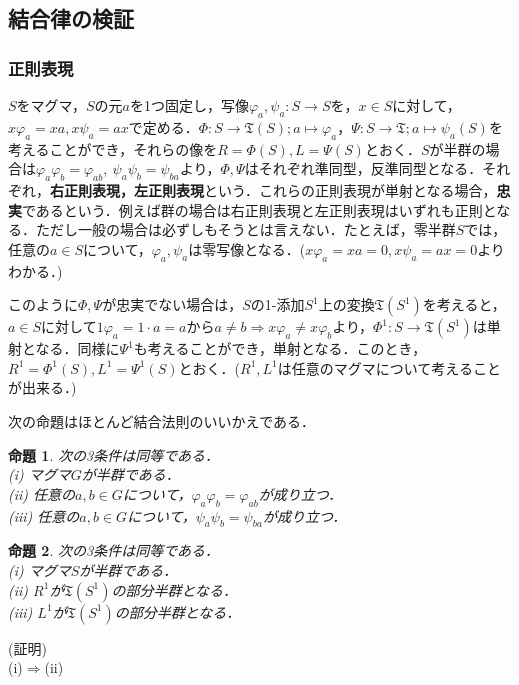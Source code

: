 \documentclass{jsarticle}
\begin{document}
\subsection{結合律の検証}
\subsubsection{正則表現}
$S$をマグマ，$S$の元$a$を1つ固定し，写像$\varphi_a, \psi_a:S\rightarrow S$を，$x\in S$に対して，$x\varphi_a=xa,x\psi_a=ax$で定める．$\Phi:S\rightarrow{\mathfrak T}(S);a\mapsto \varphi_a$，$\Psi:S\rightarrow{\mathfrak T};a\mapsto \psi_a(S)$を考えることができ，それらの像を$R=\Phi(S), L=\Psi(S)$とおく．$S$が半群の場合は$\varphi_a\varphi_b=\varphi_{ab},\:\psi_a\psi_b=\psi_{ba}$より，$\Phi,\Psi$はそれぞれ準同型，反準同型となる．それぞれ，{\bf 右正則表現，左正則表現}という．これらの正則表現が単射となる場合，{\bf 忠実}であるという．例えば群の場合は右正則表現と左正則表現はいずれも正則となる．ただし一般の場合は必ずしもそうとは言えない．たとえば，零半群$S$では，任意の$a\in S$について，$\varphi_a,\psi_a$は零写像となる．($x\varphi_a=xa=0, x\psi_a=ax=0$よりわかる．)\par
このように$\Phi,\Psi$が忠実でない場合は，$S$の1-添加$S^1$上の変換${\mathfrak T}(S^1)$を考えると，$a\in S$に対して$1\varphi_a=1\cdot a=a$から$a\neq b\Rightarrow x\varphi_a\neq x\varphi_b$より，$\Phi^1:S\rightarrow{\mathfrak T}(S^1)$は単射となる．同様に$\Psi^1$も考えることができ，単射となる．このとき，$R^1=\Phi^1(S), L^1=\Psi^1(S)$とおく．($R^1,L^1$は任意のマグマについて考えることが出来る．)\par
次の命題はほとんど結合法則のいいかえである．
\newtheorem{prop}{命題}
\begin{prop}
次の3条件は同等である．\\
(i) マグマ$G$が半群である．\\
(ii) 任意の$a,b\in G$について，$\varphi_a\varphi_b=\varphi_{ab}$が成り立つ．\\
(iii) 任意の$a,b\in G$について，$\psi_a\psi_b=\psi_{ba}$が成り立つ．
\end{prop}
\begin{prop}
次の3条件は同等である．\\
(i) マグマ$S$が半群である．\\
(ii) $R^1$が${\mathfrak T}(S^1)$の部分半群となる． \\
(iii) $L^1$が${\mathfrak T}(S^1)$の部分半群となる．
\end{prop}
(証明) \\
(i)$\Rightarrow$(ii) \\
\end{document}
